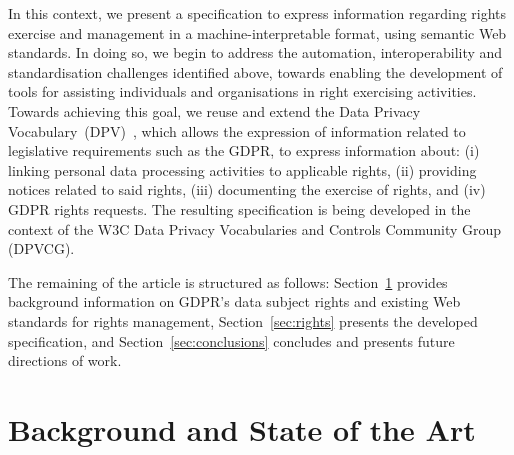 \documentclass{IOS-Book-Article}     %
\begin{document}
In this context, we present a specification to express information regarding rights exercise and management in a machine-interpretable format, using semantic Web standards.
In doing so, we begin to address the automation, interoperability and standardisation challenges identified above, towards enabling the development of tools for assisting individuals and organisations in right exercising activities. 
Towards achieving this goal, we reuse and extend the Data Privacy Vocabulary~(DPV)~\cite{panditCreatingVocabularyData2019,pandit2024dpv}, which allows the expression of information related to legislative requirements such as the GDPR, to express information about:
(i) linking personal data processing activities to applicable rights,
(ii) providing notices related to said rights,
(iii) documenting the exercise of rights, and
(iv) GDPR rights requests.
The resulting specification is being developed in the context of the W3C Data Privacy Vocabularies and Controls Community Group (DPVCG).

The remaining of the article is structured as follows: Section~\ref{sec:sota} provides background information on GDPR's data subject rights and existing Web standards for rights management, Section~\ref{sec:rights} presents the developed specification, 
and Section~\ref{sec:conclusions} concludes and presents future directions of work.

\section{Background and State of the Art}
\label{sec:sota}
\end{document}

